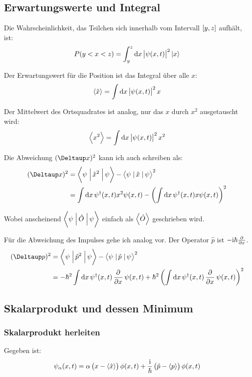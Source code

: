 \subsection{Erwartungswerte und Integral}

Die Wahrscheinlichkeit, das Teilchen sich innerhalb vom Intervall $\intcc{y,
z}$ aufhält, ist:
\[
	P(y < x < z) = \int_y^z \dif x \, \abs{\psi(x, t)}^2 \ket x
\]

Der Erwartungswert für die Position ist das Integral über alle $x$:
\[
	\bracket{\hat x} = \int\dif x \, \abs{\psi(x, t)}^2 x
\]

Der Mittelwert des Ortsquadrates ist analog, nur das $x$ durch $x^2$
ausgetauscht wird:
\[
	\bracket{x^2} = \int\dif x \, \abs{\psi(x, t)}^2 x^2
\]

Die Abweichung $(\Deltaup x)^2$ kann ich auch schreiben als:
\cite{wikipedia-quantum_operators}
\begin{align*}
	(\Deltaup x)^2
	&= \braproket{\psi}{\hat x^2}{\psi} - \braproket{\psi}{\hat x}{\psi}^2 \\
	&= \int \dif x \, \psi^\dagger(x, t) x^2 \psi(x, t) - \del{\int \dif x \, \psi^\dagger(x, t) x \psi(x, t)}^2
\end{align*}

Wobei anscheinend $\braproket{\psi}{\hat O}{\psi}$ einfach als $\left\langle \hat
O \right\rangle$ geschrieben wird.

Für die Abweichung des Impulses gehe ich analog vor. Der Operator $\hat p$ ist
$- \ii \hbar \pd{}x$.
\begin{align*}
	(\Deltaup p)^2
	&= \braproket{\psi}{\hat p^2}{\psi} - \braproket{\psi}{\hat p}{\psi}^2 \\
	&= - \hbar^2 \int \dif x \, \psi^\dagger(x, t) \dpd{}x \psi(x, t) + \hbar^2 \del{\int \dif x \, \psi^\dagger(x, t) \dpd{}x \psi(x, t)}^2
\end{align*}

\subsection{Skalarprodukt und dessen Minimum}

\subsubsection{Skalarprodukt herleiten}

Gegeben ist:
\[
	\psi_\alpha(x, t) = \alpha \del{x - \bracket{\hat x}} \phi(x, t) + \frac\ii\hbar \del{\hat p - \bracket p} \phi(x, t)
\]

